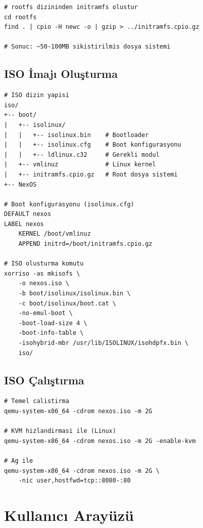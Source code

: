 \documentclass[12pt,a4paper]{report}
\begin{document}
\begin{lstlisting}[style=bashstyle,caption={Initramfs Paketleme}]
# rootfs dizininden initramfs olustur
cd rootfs
find . | cpio -H newc -o | gzip > ../initramfs.cpio.gz

# Sonuc: ~50-100MB sikistirilmis dosya sistemi
\end{lstlisting}

\section{ISO İmajı Oluşturma}

\begin{lstlisting}[style=bashstyle,caption={ISO Olusturma}]
# ISO dizin yapisi
iso/
+-- boot/
|   +-- isolinux/
|   |   +-- isolinux.bin    # Bootloader
|   |   +-- isolinux.cfg    # Boot konfigurasyonu
|   |   +-- ldlinux.c32     # Gerekli modul
|   +-- vmlinuz             # Linux kernel
|   +-- initramfs.cpio.gz   # Root dosya sistemi
+-- NexOS

# Boot konfigurasyonu (isolinux.cfg)
DEFAULT nexos
LABEL nexos
    KERNEL /boot/vmlinuz
    APPEND initrd=/boot/initramfs.cpio.gz

# ISO olusturma komutu
xorriso -as mkisofs \
    -o nexos.iso \
    -b boot/isolinux/isolinux.bin \
    -c boot/isolinux/boot.cat \
    -no-emul-boot \
    -boot-load-size 4 \
    -boot-info-table \
    -isohybrid-mbr /usr/lib/ISOLINUX/isohdpfx.bin \
    iso/
\end{lstlisting}

\section{ISO Çalıştırma}

\begin{lstlisting}[style=bashstyle,caption={QEMU ile Test}]
# Temel calistirma
qemu-system-x86_64 -cdrom nexos.iso -m 2G

# KVM hizlandirmasi ile (Linux)
qemu-system-x86_64 -cdrom nexos.iso -m 2G -enable-kvm

# Ag ile
qemu-system-x86_64 -cdrom nexos.iso -m 2G \
    -nic user,hostfwd=tcp::8080-:80
\end{lstlisting}

\chapter{Kullanıcı Arayüzü}
\end{document}
